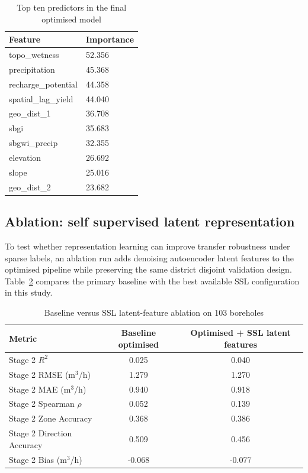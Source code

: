 \documentclass[preprint,12pt]{elsarticle}
\begin{document}
\begin{table}[h]
\centering
\caption{Top ten predictors in the final optimised model}
\label{tab:featimp}
\begin{tabular}{ll}
\toprule
Feature & Importance \\
\midrule
topo\_wetness & 52.356 \\
precipitation & 45.368 \\
recharge\_potential & 44.358 \\
spatial\_lag\_yield & 44.040 \\
geo\_dist\_1 & 36.708 \\
sbgi & 35.683 \\
sbgwi\_precip & 32.355 \\
elevation & 26.692 \\
slope & 25.016 \\
geo\_dist\_2 & 23.682 \\
\bottomrule
\end{tabular}
\end{table}

\subsection{Ablation: self supervised latent representation}
To test whether representation learning can improve transfer robustness under sparse labels, an ablation run adds denoising autoencoder latent features to the optimised pipeline while preserving the same district disjoint validation design. Table~\ref{tab:ablation} compares the primary baseline with the best available SSL configuration in this study.

\begin{table}[h]
\centering
\caption{Baseline versus SSL latent-feature ablation on 103 boreholes}
\label{tab:ablation}
\begin{tabular}{lcc}
\toprule
Metric & Baseline optimised & Optimised + SSL latent features \\
\midrule
Stage 2 $R^2$ & 0.025 & 0.040 \\
Stage 2 RMSE (m$^3$/h) & 1.279 & 1.270 \\
Stage 2 MAE (m$^3$/h) & 0.940 & 0.918 \\
Stage 2 Spearman $\rho$ & 0.052 & 0.139 \\
Stage 2 Zone Accuracy & 0.368 & 0.386 \\
Stage 2 Direction Accuracy & 0.509 & 0.456 \\
Stage 2 Bias (m$^3$/h) & -0.068 & -0.077 \\
\bottomrule
\end{tabular}
\end{table}
\end{document}
